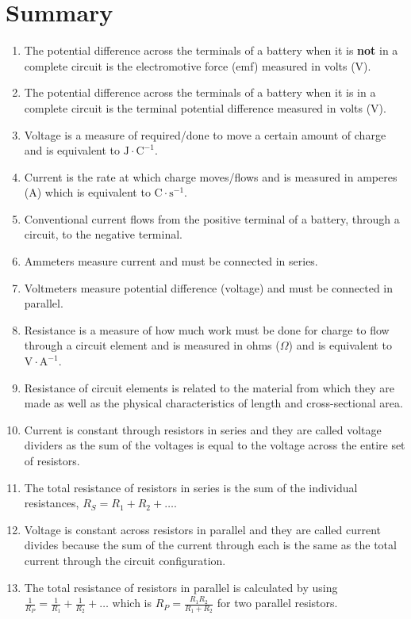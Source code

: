 \section{Summary}
\nopagebreak
\label{m38781*id201947}\begin{enumerate}[noitemsep, label=\textbf{\arabic*}. ] 
\item The potential difference across the terminals of a battery when it is \textbf{not} in a complete circuit is the electromotive force (emf) measured in volts (V).
\item The potential difference across the terminals of a battery when it is in a complete circuit is the terminal potential difference measured in volts (V).
\item Voltage is a measure of required/done to move a certain amount of charge and is equivalent to $\text{J}\cdot\text{C}^{-1}$.
\item Current is the rate at which charge moves/flows and is measured in amperes (A) which is equivalent to $\text{C}\cdot\text{s}^{-1}$.
\item Conventional current flows from the positive terminal of a battery, through a circuit, to the negative terminal.
\item Ammeters measure current and must be connected in series.
\item Voltmeters measure potential difference (voltage) and must be connected in parallel.
\item Resistance is a measure of how much work must be done for charge to flow through a circuit element and is measured in ohms ($\Omega$) and is equivalent to $\text{V}\cdot\text{A}^{-1}$.
\item Resistance of circuit elements is related to the material from which they are made as well as the physical characteristics of length and cross-sectional area.
\item Current is constant through resistors in series and they are called voltage dividers as the sum of the voltages is equal to the voltage across the entire set of resistors.
\item The total resistance of resistors in series is the sum of the individual resistances, $R_S=R_1+R_2+\ldots$.
\item Voltage is constant across resistors in parallel and they are called current divides because the sum of the current through each is the same as the total current through the circuit configuration.
\item The total resistance of resistors in parallel is calculated by using $\frac{1}{R_P}=\frac{1}{R_1}+\frac{1}{R_2}+\ldots$ which is $R_P=\frac{R_1R_2}{R_1+R_2}$ for two parallel resistors.
\end{enumerate}

